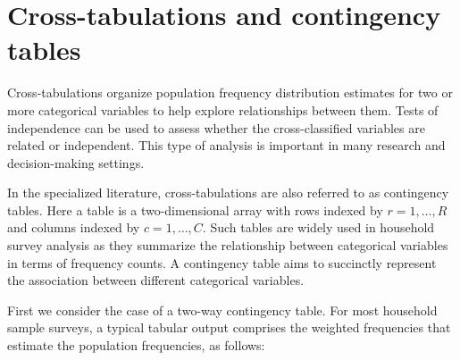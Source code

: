 \documentclass[
  12pt,
]{book}
\begin{document}
\hypertarget{cross-tabulations-and-contingency-tables}{%
\section{Cross-tabulations and contingency tables}\label{cross-tabulations-and-contingency-tables}}

Cross-tabulations organize population frequency distribution estimates for two or more categorical variables to help explore relationships between them. Tests of independence can be used to assess whether the cross-classified variables are related or independent. This type of analysis is important in many research and decision-making settings.

In the specialized literature, cross-tabulations are also referred to as contingency tables. Here a table is a two-dimensional array with rows indexed by \(r=1,\ldots,R\) and columns indexed by \(c=1,\ldots,C\). Such tables are widely used in household survey analysis as they summarize the relationship between categorical variables in terms of frequency counts. A contingency table aims to succinctly represent the association between different categorical variables.

First we consider the case of a two-way contingency table. For most household sample surveys, a typical tabular output comprises the weighted frequencies that estimate the population frequencies, as follows:
\end{document}
